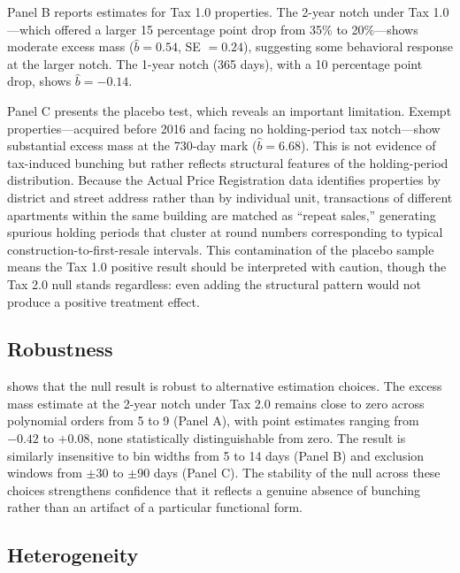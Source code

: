 \documentclass[12pt]{article}
\begin{document}
Panel B reports estimates for Tax 1.0 properties. The 2-year notch under Tax 1.0---which offered a larger 15 percentage point drop from 35\% to 20\%---shows moderate excess mass ($\hat{b}=0.54$, SE $= 0.24$), suggesting some behavioral response at the larger notch. The 1-year notch (365 days), with a 10 percentage point drop, shows $\hat{b}=-0.14$.

Panel C presents the placebo test, which reveals an important limitation. Exempt properties---acquired before 2016 and facing no holding-period tax notch---show substantial excess mass at the 730-day mark ($\hat{b}=6.68$). This is not evidence of tax-induced bunching but rather reflects structural features of the holding-period distribution. Because the Actual Price Registration data identifies properties by district and street address rather than by individual unit, transactions of different apartments within the same building are matched as ``repeat sales,'' generating spurious holding periods that cluster at round numbers corresponding to typical construction-to-first-resale intervals. This contamination of the placebo sample means the Tax 1.0 positive result should be interpreted with caution, though the Tax 2.0 null stands regardless: even adding the structural pattern would not produce a positive treatment effect.



\subsection{Robustness}

 shows that the null result is robust to alternative estimation choices. The excess mass estimate at the 2-year notch under Tax 2.0 remains close to zero across polynomial orders from 5 to 9 (Panel A), with point estimates ranging from $-0.42$ to $+0.08$, none statistically distinguishable from zero. The result is similarly insensitive to bin widths from 5 to 14 days (Panel B) and exclusion windows from $\pm$30 to $\pm$90 days (Panel C). The stability of the null across these choices strengthens confidence that it reflects a genuine absence of bunching rather than an artifact of a particular functional form.



\subsection{Heterogeneity}
\end{document}
